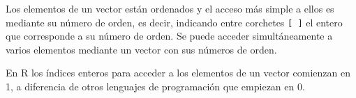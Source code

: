 \documentclass[
  spanish,
  a4paper,
]{scrreport}
\theoremstyle{definition}
\theoremstyle{definition}
\theoremstyle{remark}
\begin{document}
Los elementos de un vector están ordenados y el acceso más simple a
ellos es mediante su número de orden, es decir, indicando entre
corchetes \texttt{{[}\ {]}} el entero que corresponde a su número de
orden. Se puede acceder simultáneamente a varios elementos mediante un
vector con sus números de orden.

\begin{tcolorbox}[enhanced jigsaw, arc=.35mm, bottomrule=.15mm, bottomtitle=1mm, breakable, colback=white, colbacktitle=quarto-callout-warning-color!10!white, colframe=quarto-callout-warning-color-frame, coltitle=black, left=2mm, leftrule=.75mm, opacityback=0, opacitybacktitle=0.6, rightrule=.15mm, title=\textcolor{quarto-callout-warning-color}{\faExclamationTriangle}\hspace{0.5em}{Advertencia}, titlerule=0mm, toprule=.15mm, toptitle=1mm]

En R los índices enteros para acceder a los elementos de un vector
comienzan en 1, a diferencia de otros lenguajes de programación que
empiezan en 0.

\end{tcolorbox}
\end{document}
